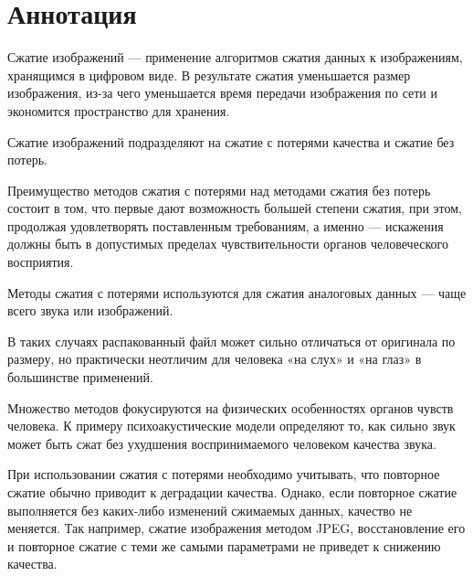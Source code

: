 \newpage
\chapter*{Аннотация}
Сжатие изображений — применение алгоритмов сжатия данных к изображениям, хранящимся в цифровом виде. 
В результате сжатия уменьшается размер изображения, из-за чего уменьшается время передачи изображения по сети и экономится пространство для хранения.

Сжатие изображений подразделяют на сжатие с потерями качества и сжатие без потерь. 

Преимущество методов сжатия с потерями над методами сжатия без потерь состоит в том, что первые дают возможность большей степени сжатия, при этом, продолжая удовлетворять поставленным требованиям, а именно — искажения должны быть в допустимых пределах чувствительности органов человеческого восприятия.

Методы сжатия с потерями используются для сжатия аналоговых данных — чаще всего звука или изображений.

В таких случаях распакованный файл может сильно отличаться от оригинала по размеру, но практически неотличим для человека «на слух» и «на глаз» в большинстве применений.

Множество методов фокусируются на физических особенностях органов чувств человека. К примеру психоакустические модели определяют то, как сильно звук может быть сжат без ухудшения воспринимаемого человеком качества звука. 

При использовании сжатия с потерями необходимо учитывать, что повторное сжатие обычно приводит к деградации качества. Однако, если повторное сжатие выполняется без каких-либо изменений сжимаемых данных, качество не меняется. Так например, сжатие изображения методом JPEG, восстановление его и повторное сжатие с теми же самыми параметрами не приведет к снижению качества.

\newpage
